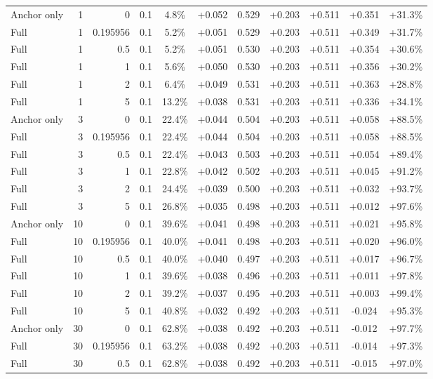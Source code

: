 \begin{table}[htbp]
\begin{tabular}{lrrrccccccc}
Anchor only & 1 & 0 & 0.1 & 4.8\% & +0.052 & 0.529 & +0.203 & +0.511 & +0.351 & +31.3\% \\
Full & 1 & 0.195956 & 0.1 & 5.2\% & +0.051 & 0.529 & +0.203 & +0.511 & +0.349 & +31.7\% \\
Full & 1 & 0.5 & 0.1 & 5.2\% & +0.051 & 0.530 & +0.203 & +0.511 & +0.354 & +30.6\% \\
Full & 1 & 1 & 0.1 & 5.6\% & +0.050 & 0.530 & +0.203 & +0.511 & +0.356 & +30.2\% \\
Full & 1 & 2 & 0.1 & 6.4\% & +0.049 & 0.531 & +0.203 & +0.511 & +0.363 & +28.8\% \\
Full & 1 & 5 & 0.1 & 13.2\% & +0.038 & 0.531 & +0.203 & +0.511 & +0.336 & +34.1\% \\
Anchor only & 3 & 0 & 0.1 & 22.4\% & +0.044 & 0.504 & +0.203 & +0.511 & +0.058 & +88.5\% \\
Full & 3 & 0.195956 & 0.1 & 22.4\% & +0.044 & 0.504 & +0.203 & +0.511 & +0.058 & +88.5\% \\
Full & 3 & 0.5 & 0.1 & 22.4\% & +0.043 & 0.503 & +0.203 & +0.511 & +0.054 & +89.4\% \\
Full & 3 & 1 & 0.1 & 22.8\% & +0.042 & 0.502 & +0.203 & +0.511 & +0.045 & +91.2\% \\
Full & 3 & 2 & 0.1 & 24.4\% & +0.039 & 0.500 & +0.203 & +0.511 & +0.032 & +93.7\% \\
Full & 3 & 5 & 0.1 & 26.8\% & +0.035 & 0.498 & +0.203 & +0.511 & +0.012 & +97.6\% \\
Anchor only & 10 & 0 & 0.1 & 39.6\% & +0.041 & 0.498 & +0.203 & +0.511 & +0.021 & +95.8\% \\
Full & 10 & 0.195956 & 0.1 & 40.0\% & +0.041 & 0.498 & +0.203 & +0.511 & +0.020 & +96.0\% \\
Full & 10 & 0.5 & 0.1 & 40.0\% & +0.040 & 0.497 & +0.203 & +0.511 & +0.017 & +96.7\% \\
Full & 10 & 1 & 0.1 & 39.6\% & +0.038 & 0.496 & +0.203 & +0.511 & +0.011 & +97.8\% \\
Full & 10 & 2 & 0.1 & 39.2\% & +0.037 & 0.495 & +0.203 & +0.511 & +0.003 & +99.4\% \\
Full & 10 & 5 & 0.1 & 40.8\% & +0.032 & 0.492 & +0.203 & +0.511 & -0.024 & +95.3\% \\
Anchor only & 30 & 0 & 0.1 & 62.8\% & +0.038 & 0.492 & +0.203 & +0.511 & -0.012 & +97.7\% \\
Full & 30 & 0.195956 & 0.1 & 63.2\% & +0.038 & 0.492 & +0.203 & +0.511 & -0.014 & +97.3\% \\
Full & 30 & 0.5 & 0.1 & 62.8\% & +0.038 & 0.492 & +0.203 & +0.511 & -0.015 & +97.0\% \\

\end{tabular}
\end{table}
